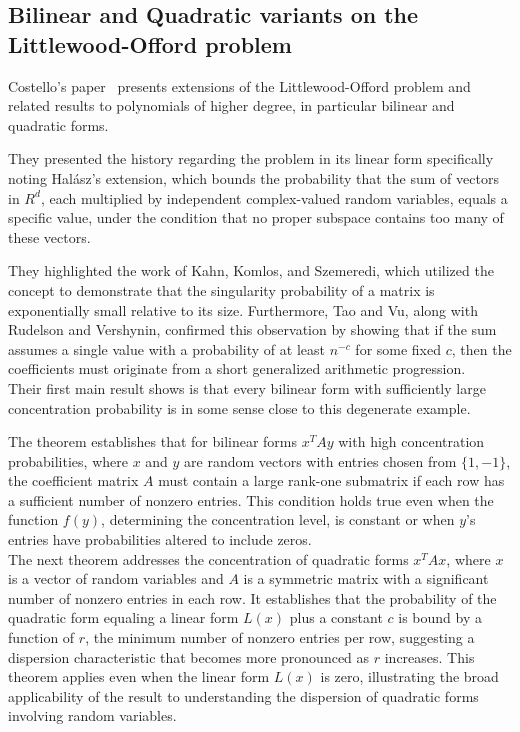 \subsection{Bilinear and Quadratic variants on the Littlewood-Offord problem}

Costello's paper~\cite{costello2009bilinear} presents extensions of the Littlewood-Offord problem and related results to polynomials of higher degree, in particular bilinear and quadratic forms.

They presented the history regarding the problem in its linear form specifically noting Halász's extension, which bounds the probability that the sum of vectors in \(R^d\), each multiplied by independent complex-valued random variables, equals a specific value, under the condition that no proper subspace contains too many of these vectors.

They highlighted the work of Kahn, Komlos, and Szemeredi, which utilized the concept to demonstrate that the singularity probability of a matrix is exponentially small relative to its size. Furthermore, Tao and Vu, along with Rudelson and Vershynin, confirmed this observation by showing that if the sum assumes a single value with a probability of at least \(n^{-c}\) for some fixed \(c\), then the coefficients must originate from a short generalized arithmetic progression.\\

Their first main result shows is that every bilinear form with sufficiently large concentration probability is in some sense close to this degenerate example.

The theorem establishes that for bilinear forms \(x^T A y\) with high concentration probabilities, where \(x\) and \(y\) are random vectors with entries chosen from \(\{1, -1\}\), the coefficient matrix \(A\) must contain a large rank-one submatrix if each row has a sufficient number of nonzero entries. This condition holds true even when the function \(f(y)\), determining the concentration level, is constant or when \(y\)'s entries have probabilities altered to include zeros.\\

The next theorem addresses the concentration of quadratic forms \(x^T A x\), where \(x\) is a vector of random variables and \(A\) is a symmetric matrix with a significant number of nonzero entries in each row. It establishes that the probability of the quadratic form equaling a linear form \(L(x)\) plus a constant \(c\) is bound by a function of \(r\), the minimum number of nonzero entries per row, suggesting a dispersion characteristic that becomes more pronounced as \(r\) increases. This theorem applies even when the linear form \(L(x)\) is zero, illustrating the broad applicability of the result to understanding the dispersion of quadratic forms involving random variables.
